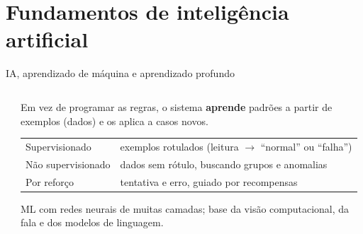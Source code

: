 \section{Fundamentos de inteligência artificial}

\begin{frame}{IA, aprendizado de máquina e aprendizado profundo}
  \begin{columns}[c]
    \begin{column}{0.44\textwidth}
      \centering
    \end{column}
    \begin{column}{0.54\textwidth}
      \begin{definicao}
        Em vez de programar as regras, o sistema \textbf{aprende} padrões a partir de exemplos (dados) e os aplica a casos novos.
      \end{definicao}
      \scriptsize
      \begin{tabularx}{\linewidth}{@{}l L@{}}
        \toprule
         &  \\
        \midrule
        Supervisionado & exemplos rotulados (leitura $\rightarrow$ ``normal'' ou ``falha'') \\
        Não supervisionado & dados sem rótulo, buscando grupos e anomalias \\
        Por reforço & tentativa e erro, guiado por recompensas \\
        \bottomrule
      \end{tabularx}
      \begin{conceito}
        ML com redes neurais de muitas camadas; base da visão computacional, da fala e dos modelos de linguagem.
      \end{conceito}
    \end{column}
  \end{columns}
\end{frame}

